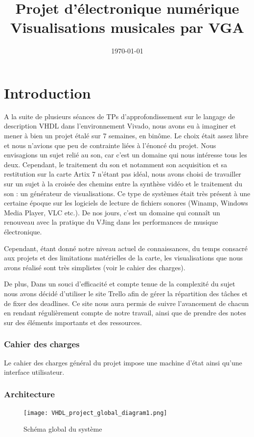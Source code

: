 \documentclass[hidelinks]{article}
\title{%
	Projet d'électronique numérique \\
	\large{Visualisations musicales par VGA}}
\date\today
\author{
	\bsc{LESTANDI Nathan}
	\and
	\bsc{ECOCHARD Florent}
}
\begin{document}
    \maketitle
    \newpage
    \tableofcontents
    \newpage
    \part*{Introduction}
	A la suite de plusieurs séances de TPs d'approfondissement sur le langage de description VHDL dans l'environnement Vivado, nous avons eu à imaginer et mener à bien un projet étalé sur 7 semaines, en binôme. Le choix était assez libre et nous n'avions que peu de contrainte liées à l'énoncé du projet. Nous envisagions un sujet relié au son, car c'est un domaine qui nous intéresse tous les deux. Cependant, le traitement du son et notamment son acquisition et sa restitution sur la carte Artix 7 n'étant pas idéal, nous avons choisi de travailler sur un sujet à la croisée des chemins entre la synthèse vidéo et le traitement du son : un générateur de visualisations. Ce type de systèmes était très présent à une certaine époque sur les logiciels de lecture de fichiers sonores (Winamp, Windows Media Player, VLC etc.). De nos jours, c'est un domaine qui connaît un renouveau avec la pratique du VJing dans les performances de musique électronique.
	
	Cependant, étant donné notre niveau actuel de connaissances, du temps consacré aux projets et des limitations matérielles de la carte, les visualisations que nous avons réalisé sont très simplistes (voir le cahier des charges).
	
	De plus, Dans un souci d'efficacité et compte tenue de la complexité du sujet nous avons décidé d'utiliser le site Trello \cite{trello} afin de gérer la répartition des tâches et de fixer des deadlines. Ce site nous aura permis de suivre l'avancement de chacun en rendant régulièrement compte de notre travail, ainsi que de prendre des notes sur des éléments importants et des ressources.
	
    \section{Cahier des charges}
    Le cahier des charges général du projet impose une machine d'état ainsi qu'une interface utilisateur.
    
    
    \section{Architecture}
    \begin{figure}[h]
    \texttt{[image: VHDL\_project\_global\_diagram1.png]}
    \caption{\label{global} Schéma global du système}
    \end{figure}
    \newpage
\end{document}
